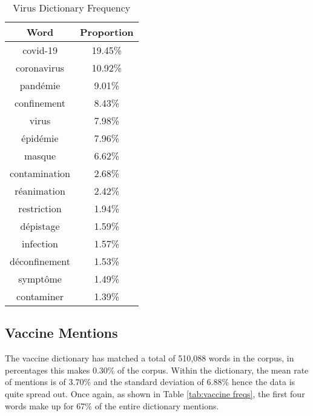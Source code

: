 \begin{table}[H]
\caption{Virus Dictionary Frequency}
\label{tab:virus freqs}
\centering
\begin{tabular}{@{}cc@{}}
\toprule
Word      & Proportion \\ \midrule
covid-19      & 19.45\% \\
coronavirus   & 10.92\% \\
pandémie      & 9.01\%  \\
confinement   & 8.43\%  \\
virus         & 7.98\%  \\
épidémie      & 7.96\%  \\
masque        & 6.62\%  \\
contamination & 2.68\%  \\
réanimation   & 2.42\%  \\
restriction   & 1.94\%  \\
dépistage     & 1.59\%  \\
infection     & 1.57\%  \\
déconfinement & 1.53\%  \\
symptôme      & 1.49\%  \\
contaminer    & 1.39\%  \\ \bottomrule
\end{tabular}
\end{table}

\subsection{Vaccine Mentions}

The vaccine dictionary has matched a total of 510,088 words in the corpus, in percentages this makes 0.30\% of the corpus. Within the dictionary, the mean rate of mentions is of 3.70\% and the standard deviation of 6.88\% hence the data is quite spread out. Once again, as shown in Table \ref{tab:vaccine freqs}, the first four words make up for 67\% of the entire dictionary mentions.

